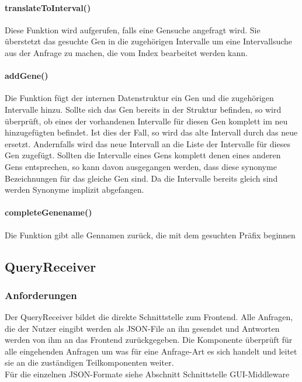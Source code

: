 \paragraph{translateToInterval()}
Diese Funktion wird aufgerufen, falls eine Gensuche angefragt wird. Sie überstetzt das gesuchte Gen in die zugehörigen Intervalle um eine Intervallsuche aus der Anfrage zu machen, die vom Index bearbeitet werden kann.

\paragraph{addGene()}
Die Funktion fügt der internen Datenstruktur ein Gen und die zugehörigen Intervalle hinzu. Sollte sich das Gen bereits in der Struktur befinden, so wird überprüft, ob eines der vorhandenen Intervalle für diesen Gen komplett im neu hinzugefügten befindet. Ist dies der Fall, so wird das alte Intervall durch das neue ersetzt. Andernfalls wird das neue Intervall an die Liste der Intervalle für dieses Gen zugefügt. Sollten die Intervalle eines Gens komplett denen eines anderen Gens entsprechen, so kann davon ausgegangen werden, dass diese synonyme Bezeichnungen für das gleiche Gen sind. Da die Intervalle bereits gleich sind werden Synonyme implizit abgefangen.

\paragraph{completeGenename()}
Die Funktion gibt alle Gennamen zurück, die mit dem gesuchten Präfix beginnen\\
\newpage

\subsection{QueryReceiver}
\subsubsection{Anforderungen}
Der QueryReceiver bildet die direkte Schnittstelle zum Frontend. Alle Anfragen, die der Nutzer eingibt werden als JSON-File an ihn gesendet und Antworten werden von ihm an das Frontend zurückgegeben. Die Komponente überprüft für alle eingehenden Anfragen um was für eine Anfrage-Art es sich handelt und leitet sie an die zuständigen Teilkomponenten weiter.\\
Für die einzelnen JSON-Formate siehe Abschnitt Schnittstelle GUI-Middleware\\

